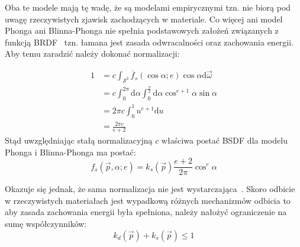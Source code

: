 
Oba te modele mają tę wadę, że są modelami empirycznymi tzn. nie biorą pod uwagę rzeczywistych zjawisk zachodzących w materiale. Co więcej ani model Phonga ani Blinna-Phonga nie spełnia podstawowych założeń związanych z funkcją BRDF~\cite{Lewis94makingshaders} tzn. łamana jest zasada odwracalności oraz zachowania energii. Aby temu zaradzić należy dokonać normalizacji:

\begin{align}
1 &= c\int_{\mathcal{S}^2}\acute{f_s}(\cos\alpha; e)\cos\alpha\mathrm{d}\vec{\omega}\nonumber\\
&= c\int_0^{2\pi}\mathrm{d}\alpha\int_0^{\frac{\pi}{2}}\mathrm{d}\alpha\cos^{e + 1}\alpha\sin\alpha\nonumber\\
&= 2\pi c\int_0^1 u^{e + 1}\mathrm{d}u\nonumber\\
&= \frac{2\pi c}{e + 2}
\end{align}
Stąd uwzględniając stałą normalizacyjną $c$ właściwa postać BSDF dla modelu Phonga i Blinna-Phonga ma postać:
\begin{equation}
f_s(\vec{p}, \alpha; e) = k_s(\vec{p})\frac{e + 2}{2\pi}\cos^e\alpha
\label{ch1:eq:PhongBRDFNormalized}
\end{equation}

Okazuje się jednak, że sama normalizacja nie jest wystarczająca~\cite{Lafortune94usingthe}. Skoro odbicie w rzeczywistych materiałach jest wypadkową różnych mechanizmów odbicia to aby zasada zachowania energii była spełniona, należy nałożyć ograniczenie na sumę współczynników:
\begin{equation}
k_d(\vec{p}) + k_s(\vec{p}) \leq 1
\end{equation}

